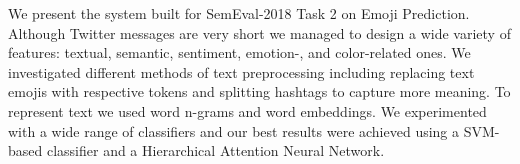 We present the system built for SemEval-2018 Task 2 on Emoji Prediction. Although Twitter messages are very short we managed to design a wide variety of features: textual, semantic, sentiment, emotion-, and color-related ones. We investigated different methods of text preprocessing including replacing text emojis with respective tokens and splitting hashtags to capture more meaning. To represent text we used word n-grams and word embeddings. We experimented with a wide range of classifiers and our best results were achieved using a SVM-based classifier and a Hierarchical Attention Neural Network.

